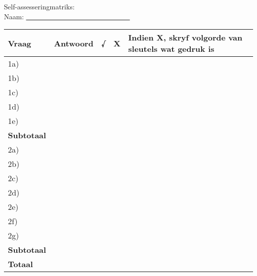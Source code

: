Self-assesseringmatriks: \\
Naam: \underline{~~~~~~~~~~~~~~~~~~~~~~~~~~~~~~}
\begin{table}[H]
 \begin{center}
  \begin{tabular}{|p{1.5cm}|p{1.5cm}|p{1cm}|p{1cm}|p{6cm}|} \hline

\textbf{Vraag} & \textbf{Antwoord} & \textbf{√} & \textbf{X} & \textbf{Indien X, skryf volgorde van sleutels wat gedruk is} \\ \hline
1a) &&&&\\ \hline
1b)&&&&\\ \hline
1c)&&&&\\ \hline
1d)&&&&\\ \hline
1e)&&&&\\ \hline
\textbf{Subtotaal}&&&&\\ \hline
2a)&&&&\\ \hline
2b)&&&&\\ \hline
2c)&&&&\\ \hline
2d)&&&&\\ \hline
2e)&&&&\\ \hline
2f)&&&&\\ \hline
2g)&&&&\\ \hline
\textbf{Subtotaal}&&&&\\ \hline
\textbf{Totaal}&&&& \\ \hline


   
  \end{tabular}

 \end{center}

\end{table}

